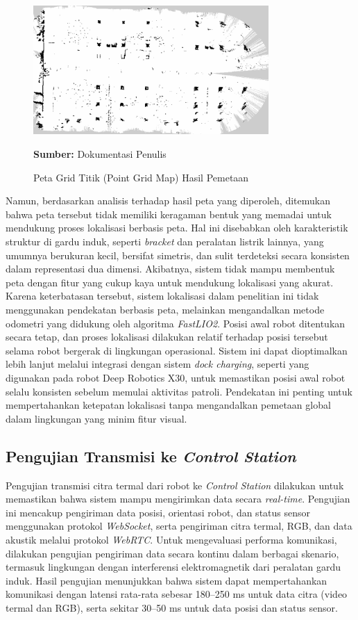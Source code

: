 \begin{figure}[H]
\centering
\includegraphics[width=0.8\textwidth]{gambar/bab4/pgm_gitet.png}
\caption{Peta Grid Titik (Point Grid Map) Hasil Pemetaan}
\label{fig:point_grid_map}
\footnotesize{\textbf{Sumber:} Dokumentasi Penulis}
\end{figure}

Namun, berdasarkan analisis terhadap hasil peta yang diperoleh, ditemukan bahwa peta tersebut tidak memiliki keragaman bentuk yang memadai untuk mendukung proses lokalisasi berbasis peta. Hal ini disebabkan oleh karakteristik struktur di gardu induk, seperti \textit{bracket} dan peralatan listrik lainnya, yang umumnya berukuran kecil, bersifat simetris, dan sulit terdeteksi secara konsisten dalam representasi dua dimensi. Akibatnya, sistem tidak mampu membentuk peta dengan fitur yang cukup kaya untuk mendukung lokalisasi yang akurat. Karena keterbatasan tersebut, sistem lokalisasi dalam penelitian ini tidak menggunakan pendekatan berbasis peta, melainkan mengandalkan metode odometri yang didukung oleh algoritma \textit{FastLIO2}. Posisi awal robot ditentukan secara tetap, dan proses lokalisasi dilakukan relatif terhadap posisi tersebut selama robot bergerak di lingkungan operasional. Sistem ini dapat dioptimalkan lebih lanjut melalui integrasi dengan sistem \textit{dock charging}, seperti yang digunakan pada robot Deep Robotics X30, untuk memastikan posisi awal robot selalu konsisten sebelum memulai aktivitas patroli. Pendekatan ini penting untuk mempertahankan ketepatan lokalisasi tanpa mengandalkan pemetaan global dalam lingkungan yang minim fitur visual.



\subsection{Pengujian Transmisi ke \emph{Control Station}}
Pengujian transmisi citra termal dari robot ke \emph{Control Station} dilakukan untuk memastikan bahwa sistem mampu mengirimkan data secara \emph{real-time}. Pengujian ini mencakup pengiriman data posisi, orientasi robot, dan status sensor menggunakan protokol \emph{WebSocket}, serta pengiriman citra termal, RGB, dan data akustik melalui protokol \emph{WebRTC}. Untuk mengevaluasi performa komunikasi, dilakukan pengujian pengiriman data secara kontinu dalam berbagai skenario, termasuk lingkungan dengan interferensi elektromagnetik dari peralatan gardu induk. Hasil pengujian menunjukkan bahwa sistem dapat mempertahankan komunikasi dengan latensi rata-rata sebesar 180–250 ms untuk data citra (video termal dan RGB), serta sekitar 30–50 ms untuk data posisi dan status sensor.

